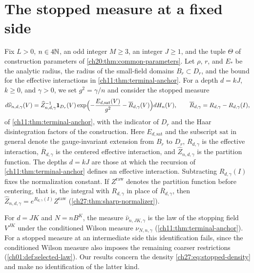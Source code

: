 \section{The stopped measure at a fixed side}\label{ch27:sec:stopped}

Fix $L>0$, $n\in4\mathbb N$, an odd integer $M\ge3$, an integer $J\ge1$, and the tuple $\Theta$ of construction parameters of \cref{ch20:thm:common-parameters}. Let $\rho$, $r$, and $E_*$ be the analytic radius, the radius of the small-field domains $B_r\subset D_r$, and the bound for the effective interactions in \cref{ch11:thm:terminal-anchor}. For a depth $d=kJ$, $k\ge0$, and $\gamma>0$, we set $g^2=\gamma/n$ and consider the stopped measure
\begin{equation}\label{ch27:eq:stopped-density}
 d\widehat\nu_{n,d,\gamma}(V)=\widehat Z_{n,d,\gamma}^{-1}\mathbf 1_{D_r}(V)\exp\Bigl(-\frac{E_{d,\mathrm{sat}}(V)}{g^2}-\overline R_{d,\gamma}(V)\Bigr)dH_n(V),\qquad \overline R_{d,\gamma}=R_{d,\gamma}-R_{d,\gamma}(I),
\end{equation}
of \cref{ch11:thm:terminal-anchor}, with the indicator of $D_r$ and the Haar disintegration factors of the construction. Here $E_{d,\mathrm{sat}}$ and the subscript $\mathrm{sat}$ in general denote the gauge-invariant extension from $B_r$ to $D_r$, $R_{d,\gamma}$ is the effective interaction, $\overline R_{d,\gamma}$ is the centered effective interaction, and $\widehat Z_{n,d,\gamma}$ is the partition function. The depths $d=kJ$ are those at which the recursion of \cref{ch11:thm:terminal-anchor} defines an effective interaction. Subtracting $R_{d,\gamma}(I)$ fixes the normalization constant. If $Z^{\mathrm{raw}}$ denotes the partition function before centering, that is, the integral with $R_{d,\gamma}$ in place of $\overline R_{d,\gamma}$, then $\widehat Z_{n,d,\gamma}=e^{R_{d,\gamma}(I)}Z^{\mathrm{raw}}$ (\cref{ch27:thm:sharp-normalizer}).

For $d=JK$ and $N=nB^K$, the measure $\widehat\nu_{n,JK,\gamma}$ is the law of the stopping field $V^{JK}$ under the conditioned Wilson measure $\nu_{N,n,\gamma}$ (\cref{ch11:thm:terminal-anchor}). For a stopped measure at an intermediate side this identification fails, since the conditioned Wilson measure also imposes the remaining coarser restrictions (\cref{ch01:def:selected-law}). Our results concern the density \eqref{ch27:eq:stopped-density} and make no identification of the latter kind.

